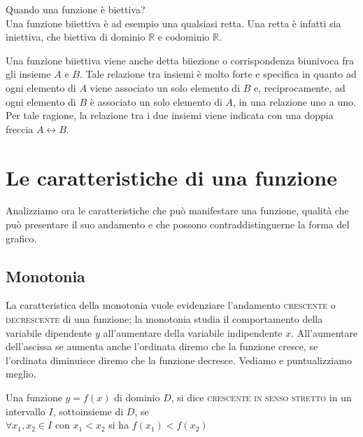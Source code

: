 \begin{esempio} Quando una funzione è biettiva?\\
Una funzione biiettiva è ad esempio una qualsiasi retta. Una retta è infatti 
sia iniettiva, che biettiva di dominio $\mathbb{R}$ e codominio 
$\mathbb{R}$.\\
\end{esempio}

Una funzione biiettiva viene anche detta biiezione o corrispondenza biunivoca 
fra gli insieme $A$ e $B$. Tale relazione tra insiemi è molto forte e 
specifica in quanto ad ogni elemento di $A$ viene associato un solo elemento 
di $B$ e, reciprocamente, ad ogni elemento di $B$ è associato un solo 
elemento di $A$, in una relazione uno a uno. Per tale ragione, la relazione 
tra i due insiemi viene indicata con una doppia freccia $A\leftrightarrow B$.
%
\section{Le caratteristiche di una funzione}
Analizziamo ora le caratteristiche che può manifestare una funzione, qualità 
che può presentare il suo andamento e che possono contraddistinguerne la 
forma del grafico.

\subsection{Monotonia}
La caratteristica della monotonia vuole evidenziare l'andamento 
\textsc{crescente} o \textsc{decrescente} di una funzione; la monotonia 
studia il comportamento della variabile dipendente $y$ all'aumentare della 
variabile indipendente $x$. All'aumentare dell'ascissa se aumenta anche 
l'ordinata diremo che la funzione cresce, se l'ordinata diminuisce diremo che 
la funzione decresce. Vediamo e puntualizziamo meglio.\\

\begin{definizione}
Una funzione $y=f(x)$ di dominio $D$, si dice \textsc{crescente in senso 
stretto} in un intervallo $I$, sottoinsieme di $D$, se\\

$\forall x_1,x_2\in I$  con $x_1<x_2 $ si ha $f(x_1)<f(x_2)$\\
\end{definizione}

